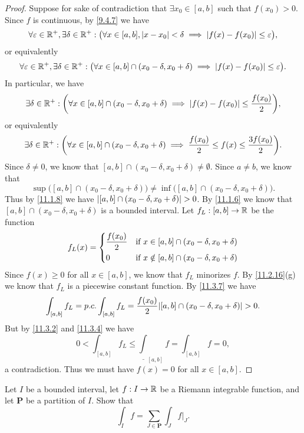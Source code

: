 \begin{proof}
  Suppose for sake of contradiction that \(\exists x_0 \in [a, b]\) such that \(f(x_0) > 0\).
  Since \(f\) is continuous, by \cref{9.4.7} we have
  \[
    \forall \varepsilon \in \mathbb{R}^+, \exists \delta \in \mathbb{R}^+ : \big(\forall x \in [a, b], \left\lvert x - x_0\right\rvert < \delta \implies \left\lvert f(x) - f(x_0)\right\rvert \leq \varepsilon\big),
  \]
  or equivalently
  \[
    \forall \varepsilon \in \mathbb{R}^+, \exists \delta \in \mathbb{R}^+ : \big(\forall x \in [a, b] \cap (x_0 - \delta, x_0 + \delta) \implies \left\lvert f(x) - f(x_0)\right\rvert \leq \varepsilon\big).
  \]
  In particular, we have
  \[
    \exists \delta \in \mathbb{R}^+ : \bigg(\forall x \in [a, b] \cap (x_0 - \delta, x_0 + \delta) \implies \left\lvert f(x) - f(x_0)\right\rvert \leq \dfrac{f(x_0)}{2}\bigg),
  \]
  or equivalently
  \[
    \exists \delta \in \mathbb{R}^+ : \bigg(\forall x \in [a, b] \cap (x_0 - \delta, x_0 + \delta) \implies \dfrac{f(x_0)}{2} \leq f(x) \leq \dfrac{3 f(x_0)}{2}\bigg).
  \]
  Since \(\delta \neq 0\), we know that \([a, b] \cap (x_0 - \delta, x_0 + \delta) \neq \emptyset\).
  Since \(a \neq b\), we know that
  \[
    \sup\big([a, b] \cap (x_0 - \delta, x_0 + \delta)\big) \neq \inf\big([a, b] \cap (x_0 - \delta, x_0 + \delta)\big).
  \]
  Thus by \cref{11.1.8} we have \(\left\lvert[a, b] \cap (x_0 - \delta, x_0 + \delta)\right\rvert > 0\).
  By \cref{11.1.6} we know that \([a, b] \cap (x_0 - \delta, x_0 + \delta)\) is a bounded interval.
  Let \(f_L : [a, b] \to \mathbb{R}\) be the function
  \[
    f_L(x) = \begin{dcases}
      \dfrac{f(x_0)}{2} & \text{if } x \in [a, b] \cap (x_0 - \delta, x_0 + \delta)    \\
      0                 & \text{if } x \notin [a, b] \cap (x_0 - \delta, x_0 + \delta)
    \end{dcases}
  \]
  Since \(f(x) \geq 0\) for all \(x \in [a, b]\), we know that \(f_L\) minorizes \(f\).
  By \cref{11.2.16}(g) we know that \(f_L\) is a piecewise constant function.
  By \cref{11.3.7} we have
  \[
    \int_{[a, b]} f_L = p.c. \int_{[a, b]} f_L = \dfrac{f(x_0)}{2}\abs{[a, b] \cap (x_0 - \delta, x_0 + \delta)} > 0.
  \]
  But by \cref{11.3.2} and \cref{11.3.4} we have
  \[
    0 < \int_{[a, b]} f_L \leq \underline{\int}_{[a, b]} f = \int_{[a, b]} f = 0,
  \]
  a contradiction.
  Thus we must have \(f(x) = 0\) for all \(x \in [a, b]\).
\end{proof}

\begin{ex}\label{ex:11.4.3}
  Let \(I\) be a bounded interval, let \(f : I \to \mathbb{R}\) be a Riemann integrable function, and let \(\mathbf{P}\) be a partition of \(I\).
  Show that
  \[
    \int_I f = \sum_{J \in \mathbf{P}} \int_J f|_J.
  \]
\end{ex}


